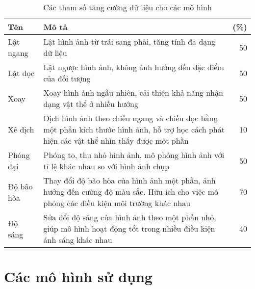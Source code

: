 \documentclass[../the.tex]{subfiles}
\begin{document}
\begin{table}[ht!]
    \centering
    \caption{Các tham số tăng cường dữ liệu cho các mô hình}
    \begin{tabular}{|l|p{7cm}|r|}
        \hline
        \textbf{Tên}
                   & \textbf{Mô tả}
                   & \textbf{(\%)}
        \\ \hline
        Lật ngang  & Lật hình ảnh từ trái sang phải, tăng tính đa dạng dữ liệu                                                                                    & 50 \\  \hline
        Lật dọc    & Lật ngược hình ảnh, không ảnh hưởng đến đặc điểm của đối tượng                                                                               & 50 \\  \hline
        Xoay       & Xoay hình ảnh ngẫu nhiên, cải thiện khả năng nhận dạng vật thể ở nhiều hướng                                                                 & 50 \\  \hline
        Xê dịch    & Dịch hình ảnh theo chiều ngang và chiều dọc bằng một phần kích thước hình ảnh, hỗ trợ học cách phát hiện các vật thể nhìn thấy được một phần & 10 \\  \hline
        Phóng đại  & Phóng to, thu nhỏ hình ảnh, mô phỏng hình ảnh với tỉ lệ khác nhau so với hình ảnh chụp                                                       & 50 \\  \hline
        Độ bão hòa & Thay đổi độ bão hòa của hình ảnh một phần, ảnh hưởng đến cường độ màu sắc. Hữu ích cho việc mô phỏng các điều kiện môi trường khác nhau      & 70 \\ \hline
        Độ sáng    & Sửa đổi độ sáng của hình ảnh theo một phần nhỏ, giúp mô hình hoạt động tốt trong nhiều điều kiện ánh sáng khác nhau                          & 40 \\ \hline
    \end{tabular}
    \label{tab:thamso}
\end{table}


\section{Các mô hình sử dụng}
\label{sec:model}
\end{document}
